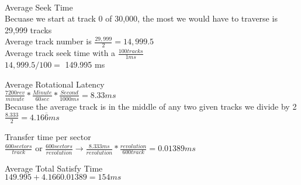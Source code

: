 \documentclass[12pt,largemargins]{homework}
\begin{document}
\\
\begin{alphaparts}
	\item 
	Average Seek Time\\
	Becuase we start at track 0 of 30,000, the most we would have to traverse is 29,999 tracks\\
	Average track number is $ \frac{29,999}{2} = 14,999.5$\\
	Average track seek time with a $ \frac{100 tracks}{1 ms} $\\
	$ 14,999.5/100 = $ 149.995 ms\\
	\item 
	Average Rotational Latency\\
	$ \frac{7200 rev}{minute} * \frac{Minute}{60 sec} * \frac{Second}{1000ms} = 8.33ms$\\
	Because the average track is in the middle of any two given tracks we divide by 2\\
	$ \frac{8.333}{2} = 4.16\overline{6} ms$\\
	\item 
	Transfer time per sector\\
	$ \frac{600 sectors}{track} $ or $ \frac{600 sectors}{revolution} \rightarrow \frac{8.333ms}{revolution} * \frac{revolution}{600 track} = 0.01389 ms$\\
	\item
	Average Total Satisfy Time\\
	$ 149.995 + 4.166 0.01389 = 154 ms$\\
	
\end{alphaparts}
\end{document}
